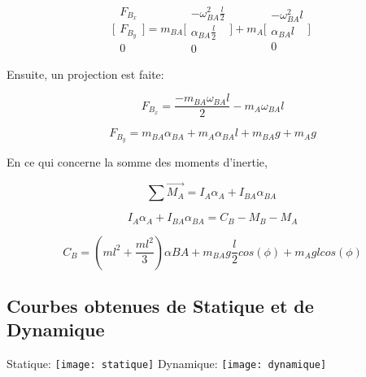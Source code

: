 \documentclass{article}
\begin{document}
\begin{equation}
    \Bigg[\begin{array}{cc}
    F_{B_x} \\
    F_{B_y} \\
    0
    \end{array}\Bigg]
    =
    m_{BA}\Bigg[\begin{array}{cc}
    -\omega^2_{BA}\frac{l}{2} \\
    \alpha_{BA}\frac{l}{2} \\
    0
    \end{array}\Bigg]
    +
    m_A\Bigg[\begin{array}{cc}
    -\omega^2_{BA}l \\
    \alpha_{BA}l \\
    0
    \end{array}\Bigg]
\end{equation}

\noindent Ensuite, un projection est faite:

\begin{equation}
\ F_{B_x} = \frac{-m_{BA}\omega_{BA}l}{2} - m_A\omega_{BA}l 
\end{equation}

\begin{equation}
\ F_{B_y} = m_{BA}\alpha_{BA} + m_A\alpha_{BA}l + m_{BA}g + m_Ag
\end{equation}

\noindent En ce qui concerne la somme des moments d'inertie, 

\begin{equation}
\sum \overrightarrow{M_A} = I_A\alpha_A + I_{BA}\alpha_{BA}
\end{equation}

\begin{equation}
\ I_A\alpha_A + I_{BA}\alpha_{BA} = C_B - M_B - M_A
\end{equation}

\begin{equation}
\ C_B = (ml^2 + \frac{ml^2}{3})\alpha{BA}+ m_{BA}g\frac{l}{2}cos(\phi) + m_Aglcos(\phi)
\end{equation}

\subsection{Courbes obtenues de Statique et de Dynamique}
Statique:
\newline
\noindent \texttt{[image: statique]}
\newpage
\noindent Dynamique:
\newline
\noindent \texttt{[image: dynamique]}
\end{document}
